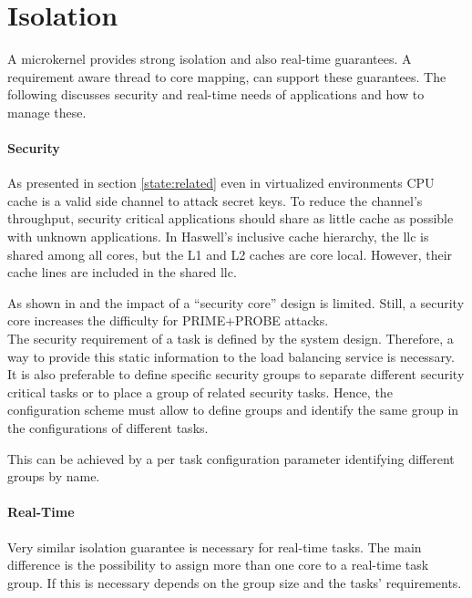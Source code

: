 \section{Isolation}
\label{design:isolation}

A microkernel provides strong isolation and also real-time guarantees.
A requirement aware thread to core mapping, can support these guarantees.
The following discusses security and real-time needs of applications and how to
manage these.

\paragraph{Security}
As presented in section \ref{state:related} even in virtualized environments
CPU cache is a valid side channel to attack secret keys.
To reduce the channel's throughput, security critical applications should share
as little cache as possible with unknown applications.
In Haswell's inclusive cache hierarchy, the \gls{llc} is shared among all
cores, but the L1 and L2 caches are core local.
However, their cache lines are included in the shared \gls{llc}.

As shown in \cite{inci_seriously_2015} and \cite{liu_last-level_2015}
the impact of a ``security core'' design is limited.
Still, a security core increases the difficulty for PRIME+PROBE attacks.
\\

The security requirement of a task is defined by the system design.
Therefore, a way to provide this static information to the load balancing
service is necessary.
It is also preferable to define specific security groups to separate different
security critical tasks or to place a group of related security tasks.
Hence, the configuration scheme must allow to define groups and identify the
same group in the configurations of different tasks.

This can be achieved by a per task configuration parameter identifying
different groups by name.


\paragraph{Real-Time}
Very similar isolation guarantee is necessary for real-time tasks.
The main difference is the possibility to assign more than one core to a
real-time task group.
If this is necessary depends on the group size and the tasks' requirements.

